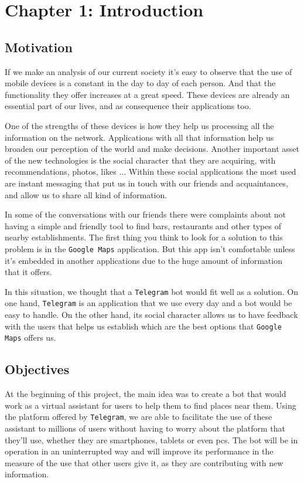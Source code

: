 \documentclass[oneside]{memoir}
\newcommand{\mychapter}[2]{
    \setcounter{chapter}{#1}
    \setcounter{section}{0}
    \chapter*{#2}
    \addcontentsline{toc}{chapter}{#2}
}
\begin{document}
\mychapter{1}{Chapter 1: Introduction}
\section{Motivation}
If we make an analysis of our current society it's easy to observe that the use of mobile devices is a constant in the day to day of each person. And that the functionality they offer increases at a great speed. These devices are already an essential part of our lives, and as consequence their applications too.

One of the strengths of these devices is how they help us processing all the information on the network. Applications with all that information help us broaden our perception of the world and make decisions. Another important asset of the new technologies is the social character that they are acquiring, with recommendations, photos, likes ... Within these social applications the most used are instant messaging that put us in touch with our friends and acquaintances, and allow us to share all kind of information.

In some of the conversations with our friends there were complaints about not having a simple and friendly tool to find bars, restaurants and other types of nearby establishments. The first thing you think to look for a solution to this problem is in the \texttt{Google Maps} application. But this app isn't comfortable unless it's embedded in another applications due to the huge amount of information that it offers.

In this situation, we thought that a \texttt{Telegram} bot would fit well as a solution. On one hand, \texttt{Telegram} is an application that we use every day and a bot would be easy to handle. On the other hand, its social character allows us to have feedback with the users that helps us establish which are the best options that \texttt{Google Maps} offers us.

\section{Objectives}
At the beginning of this project, the main idea was to create a bot that would work as a virtual assistant for users to help them to find places near them. Using the platform offered by \texttt{Telegram}, we are able to facilitate the use of these assistant to millions of users without having to worry about the platform that they'll use, whether they are smartphones, tablets or even pcs. The bot will be in operation in an uninterrupted way and will improve its performance in the measure of the use that other users give it, as they are contributing with new information.
\end{document}
